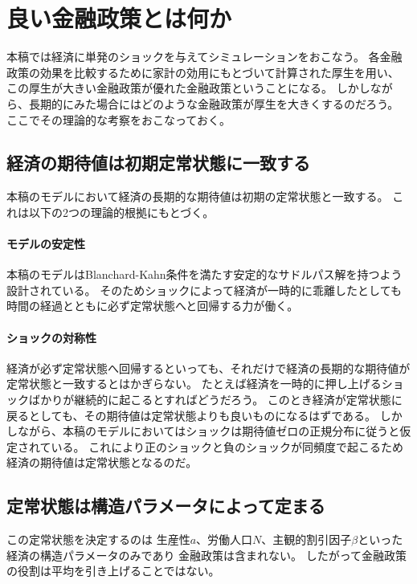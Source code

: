 
\section{良い金融政策とは何か}
\label{sec:model_preparation_criteria_main}

本稿では経済に単発のショックを与えてシミュレーションをおこなう。
各金融政策の効果を比較するために家計の効用にもとづいて計算された厚生を用い、
この厚生が大きい金融政策が優れた金融政策ということになる。
しかしながら、長期的にみた場合にはどのような金融政策が厚生を大きくするのだろう。
ここでその理論的な考察をおこなっておく。

\subsection{経済の期待値は初期定常状態に一致する}
\label{sec:model_preparation_criteria_expectation_value}

本稿のモデルにおいて経済の長期的な期待値は初期の定常状態と一致する。
これは以下の2つの理論的根拠にもとづく。
\paragraph{モデルの安定性}\label{sec:model_preparation_criteria_expectation_value_stability}
本稿のモデルはBlanchard-Kahn条件を満たす安定的なサドルパス解を持つよう設計されている。
そのためショックによって経済が一時的に乖離したとしても時間の経過とともに必ず定常状態へと回帰する力が働く。
\paragraph{ショックの対称性}\label{sec:model_preparation_criteria_expectation_value_symmetry}
経済が必ず定常状態へ回帰するといっても、それだけで経済の長期的な期待値が定常状態と一致するとはかぎらない。
たとえば経済を一時的に押し上げるショックばかりが継続的に起こるとすればどうだろう。
このとき経済が定常状態に戻るとしても、その期待値は定常状態よりも良いものになるはずである。
しかしながら、本稿のモデルにおいてはショックは期待値ゼロの正規分布に従うと仮定されている。
これにより正のショックと負のショックが同頻度で起こるため経済の期待値は定常状態となるのだ。

\subsection{定常状態は構造パラメータによって定まる}
\label{sec:model_preparation_criteria_structure_parameters}
この定常状態を決定するのは
生産性\(a\)、労働人口\(N\)、主観的割引因子\(\beta\)といった経済の構造パラメータのみであり
金融政策は含まれない。
したがって金融政策の役割は平均を引き上げることではない。

